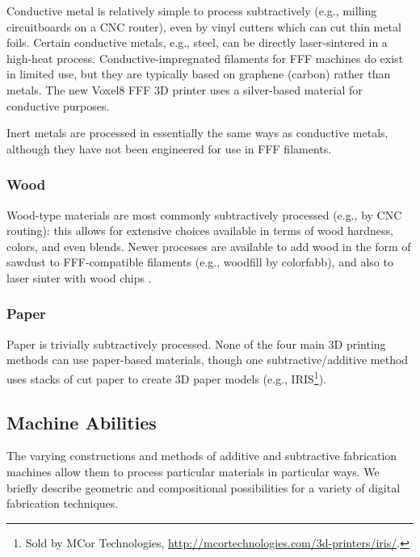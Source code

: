 Conductive metal is relatively simple to process subtractively (e.g., milling circuitboards on a CNC router), even by vinyl cutters which can cut thin metal foils. Certain conductive metals, e.g., steel, can be directly laser-sintered in a high-heat process. Conductive-impregnated filaments for FFF machines do exist in limited use, but they are typically based on graphene (carbon) rather than metals. The new Voxel8 FFF 3D printer \cite{voxel8} uses a silver-based material for conductive purposes.

Inert metals are processed in essentially the same ways as conductive metals, although they have not been engineered for use in FFF filaments.

\subsubsection{Wood}

Wood-type materials are most commonly subtractively processed (e.g., by CNC routing): this allows for extensive choices available in terms of wood hardness, colors, and even blends. Newer processes are available to add wood in the form of sawdust to FFF-compatible filaments (e.g., woodfill by colorfabb), and also to laser sinter with wood chips \cite{materialise-wood}.

\subsubsection{Paper}

Paper is trivially subtractively processed. None of the four main 3D printing methods can use paper-based materials, though one subtractive/additive method uses stacks of cut paper to create 3D paper models (e.g., IRIS\footnote{Sold by MCor Technologies, \url{http://mcortechnologies.com/3d-printers/iris/}.}).

\subsection{Machine Abilities}

The varying constructions and methods of additive and subtractive fabrication machines allow them to process particular materials in particular ways. We briefly describe geometric and compositional possibilities for a variety of digital fabrication techniques.

